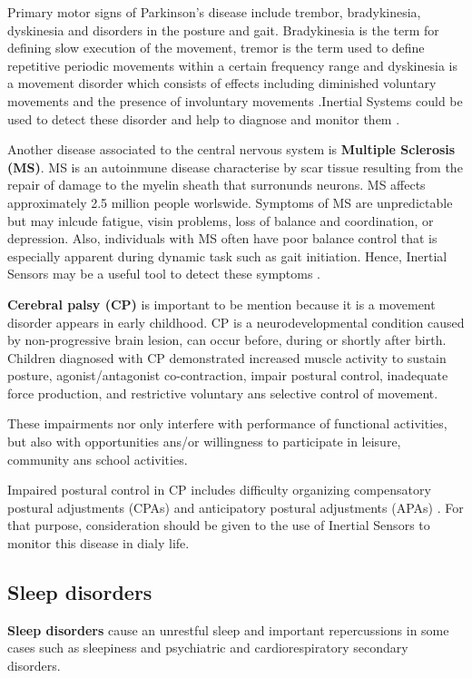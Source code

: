 Primary motor signs of Parkinson’s disease include trembor, bradykinesia, dyskinesia and disorders in the posture and gait. Bradykinesia is the term for defining slow execution of the movement, tremor is the term used to define repetitive periodic movements within a certain frequency range and dyskinesia is a movement disorder which consists of effects including diminished voluntary movements and the presence of involuntary movements .Inertial Systems could be used to detect these disorder and help to diagnose and monitor them \cite{A.Olivares2013}.

Another disease associated to the central nervous system is \textbf{Multiple Sclerosis (MS)}. MS is an autoinmune disease characterise by scar tissue resulting from the repair of damage to the myelin sheath that surronunds neurons. MS affects approximately 2.5 million people worlswide. Symptoms of MS are unpredictable but may inlcude fatigue, visin problems, loss of balance and coordination, or depression. Also, individuals with MS often have poor balance control that is especially apparent during dynamic task such as gait initiation. Hence, Inertial Sensors may be a useful tool to detect these symptoms \cite{Jebb2008}.


\textbf{Cerebral  palsy (CP)} is important to be mention  because it is a movement disorder appears in early childhood. CP is a neurodevelopmental condition caused by non-progressive brain lesion, can occur before, during or shortly after birth. Children diagnosed with CP demonstrated increased muscle activity to sustain posture, agonist/antagonist co-contraction, impair postural control, inadequate force production, and restrictive voluntary ans selective control of movement\cite{Gay2011}.

These impairments nor only interfere with performance of functional activities, but also with opportunities  ans/or willingness to participate in leisure, community ans school activities.

Impaired postural control in CP includes difficulty organizing compensatory postural adjustments (CPAs) and anticipatory postural adjustments (APAs) \cite{Gay2011}. For that purpose,  consideration should be given to the use of Inertial Sensors to monitor this disease in dialy life.
\vfill

\subsection{Sleep disorders}
\textbf{Sleep disorders} cause an unrestful sleep and important repercussions in some cases such as sleepiness and psychiatric and cardiorespiratory secondary disorders\cite{SanchezDaniel}. 

